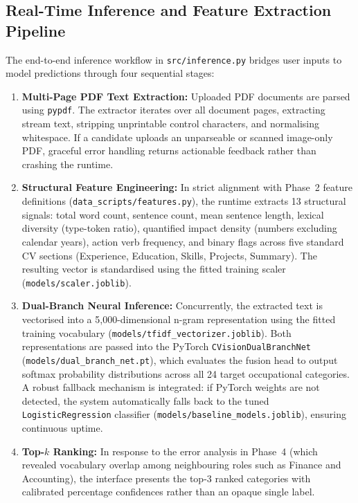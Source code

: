 \documentclass[11pt,a4paper]{article}
\begin{document}
\subsection{Real-Time Inference and Feature Extraction Pipeline}
\label{sec:inference_pipeline}

The end-to-end inference workflow in \texttt{src/inference.py} bridges user inputs
to model predictions through four sequential stages:

\begin{enumerate}
  \item \textbf{Multi-Page PDF Text Extraction:} Uploaded PDF documents are parsed
  using \texttt{pypdf}. The extractor iterates over all document pages, extracting
  stream text, stripping unprintable control characters, and normalising whitespace.
  If a candidate uploads an unparseable or scanned image-only PDF, graceful error
  handling returns actionable feedback rather than crashing the runtime.
  \item \textbf{Structural Feature Engineering:} In strict alignment with Phase~2
  feature definitions (\texttt{data\_scripts/features.py}), the runtime extracts
  13 structural signals: total word count, sentence count, mean sentence length,
  lexical diversity (type-token ratio), quantified impact density (numbers
  excluding calendar years), action verb frequency, and binary flags across five
  standard CV sections (Experience, Education, Skills, Projects, Summary). The
  resulting vector is standardised using the fitted training scaler
  (\texttt{models/scaler.joblib}).
  \item \textbf{Dual-Branch Neural Inference:} Concurrently, the extracted text is
  vectorised into a 5{,}000-dimensional n-gram representation using the fitted
  training vocabulary (\texttt{models/tfidf\_vectorizer.joblib}). Both representations
  are passed into the PyTorch \texttt{CVisionDualBranchNet}
  (\texttt{models/dual\_branch\_net.pt}), which evaluates the fusion head to output
  softmax probability distributions across all 24 target occupational categories.
  A robust fallback mechanism is integrated: if PyTorch weights are not detected,
  the system automatically falls back to the tuned \texttt{LogisticRegression}
  classifier (\texttt{models/baseline\_models.joblib}), ensuring continuous uptime.
  \item \textbf{Top-$k$ Ranking:} In response to the error analysis in Phase~4
  (which revealed vocabulary overlap among neighbouring roles such as Finance and
  Accounting), the interface presents the top-3 ranked categories with calibrated
  percentage confidences rather than an opaque single label.
\end{enumerate}
\end{document}
